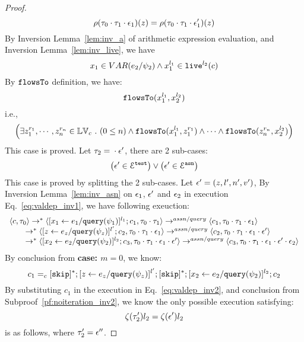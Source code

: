 {\begin{proof}
\[  \rho(\mathtt{\tau}_0 \cdot \mathtt{\tau}_1 \cdot \mathtt{\epsilon}_1) (z) =  
  \rho(\mathtt{\tau}_0 \cdot \mathtt{\tau}_1 \cdot \mathtt{\epsilon}_1') (z)
\]
%
By {Inversion Lemma~\ref{lem:inv_a}} of arithmetic expression evaluation, and Inversion Lemma~\ref{lem:inv_live}, we have 
\[
  x_1 \in VAR(e_2 / \psi_2) 
  \land x_1^{l_1} \in \mathtt{live}^{l_2}(c)
\]
%
By $\mathtt{flowsTo}$ definition, we have:
%
\[
\mathtt{flowsTo}(x_1^{l_1}, {x}_2^{l_2})
\]
i.e.,
%
\[
\Big(\exists z_1^{r_1}, \cdots, z_n^{r_n} \in \mathbb{LV}_{{c}} ~.~ (0 \leq n )
 \land \mathtt{flowsTo}(x_1^{l_1}, z_1^{r_1}) \land \cdots \land \mathtt{flowsTo}(z_n^{r_n}, {x}_2^{l_2}) \Big)
 \]
%
This case is proved.
%
%
Let $\mathtt{\tau}_2 = {} \cdot {} \mathtt{\epsilon}'$, there are 2 sub-cases: 
%
 \[
 \big(\mathtt{\epsilon}' \in \mathcal{E}^{\mathtt{{test}}}\big) \lor \big(\mathtt{\epsilon}' \in \mathcal{E}^{\mathtt{{asn}}}\big)
 \]
%
This case is proved by splitting the 2 sub-cases.
%
%
Let $\mathtt{\epsilon}' = (z, l', n', v')$, 
%
By Inversion Lemma~\ref{lem:inv_asn} on $\mathtt{\epsilon}_1$, $\mathtt{\epsilon}'$ and $\mathtt{\epsilon}_2$ in execution Eq.~\ref{eq:valdep_inv1}, we have following exeuction:
\begin{equation}
\label{eq:m1asn_inv1}
  \begin{array}{l}   
\langle {c}, \mathtt{\tau}_0 \rangle \rightarrow^{*} 
\langle [\mathrel{ {x}_1 \leftarrow e_1 / {\tt query}(\psi_1) }]^{l_1} ; {c}_1, \mathtt{\tau}_0 \cdot \mathtt{\tau}_1 \rangle  \rightarrow^{assn/query}
 \langle c_1, \mathtt{\tau}_0 \cdot \mathtt{\tau}_1 \cdot \mathtt{\epsilon}_1 \rangle \\
  \qquad \rightarrow^{*} 
  \langle [\mathrel{ z \leftarrow e_z / {\tt query}(\psi_z) }]^{l'};{c}_2, 
  \mathtt{\tau}_0 \cdot \mathtt{\tau}_1 \cdot \mathtt{\epsilon}_1 \rangle 
  \rightarrow^{assn/query} 
  \langle {c}_2,  \mathtt{\tau}_0 \cdot \mathtt{\tau}_1 \cdot \mathtt{\epsilon}_1 \cdot \mathtt{\epsilon}' \rangle  \\
  \qquad \rightarrow^{*} 
  \langle [\mathrel{ {x}_2 \leftarrow e_2 / {\tt query}(\psi_2) }]^{l_2};{c}_3, 
  \mathtt{\tau}_0 \cdot \mathtt{\tau}_1 \cdot \mathtt{\epsilon}_1\cdot \mathtt{\epsilon}' \rangle 
  \rightarrow^{assn/query} 
  \langle {c}_3,  \mathtt{\tau}_0 \cdot \mathtt{\tau}_1 \cdot \mathtt{\epsilon}_1 \cdot \mathtt{\epsilon}' \cdot \mathtt{\epsilon}_2 \rangle 
\end{array}
 \end{equation}
By conclusion from \textbf{case: $m = 0$}, we know:
 \[
 c_1 =_c 
 [\mathtt{skip}]{}^*;[\mathrel{ z \leftarrow e_z / {\tt query}(\psi_z) }]^{l'};  [\mathtt{skip}]{}^*; [\mathrel{ {x}_2 \leftarrow e_2 / {\tt query}(\psi_2) }]^{l_2};{c}_2
 \]
 By substituting $c_1$ in the execution in Eq.~\ref{eq:valdep_inv2}, and conclusion from Subproof~\ref{pf:noiteration_inv2}, we know the only possible execution satisfying:
 \[
  \mathtt{\zeta}(\mathtt{\tau}_2') l_2 = \mathtt{\zeta}(\mathtt{\epsilon}') l_2
\]
%
 is as follows, where $\mathtt{\tau}_2' = \mathtt{\epsilon}''$.

\end{proof}}

